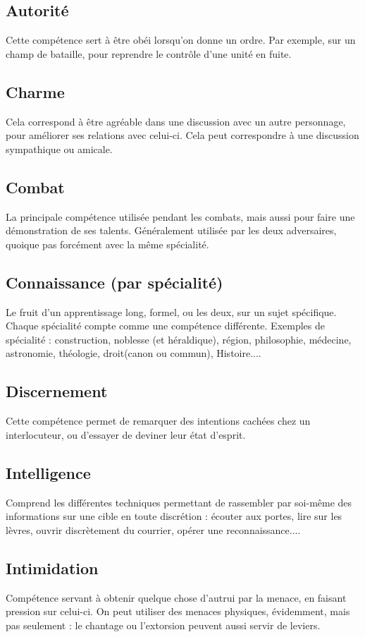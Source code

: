 \documentclass[10pt,a4paper]{book}
\begin{document}
\begin{multicols}{2}
\subsection*{Autorité} Cette compétence sert à être obéi lorsqu'on donne un ordre. Par exemple, sur un champ de bataille, pour reprendre le contrôle d'une unité en fuite.
\subsection*{Charme}Cela correspond à être agréable dans une discussion avec un autre personnage, pour améliorer ses relations avec celui-ci. Cela peut correspondre à une discussion sympathique ou amicale.
\subsection*{Combat} La principale compétence utilisée pendant les combats, mais aussi pour faire une démonstration de ses talents. Généralement utilisée par les deux adversaires, quoique pas forcément avec la même spécialité.
\subsection*{Connaissance (par spécialité)} Le fruit d'un apprentissage long, formel, ou les deux, sur un sujet spécifique. Chaque spécialité compte comme une compétence différente. Exemples de spécialité : construction, noblesse (et héraldique), région, philosophie, médecine, astronomie, théologie, droit(canon ou commun), Histoire....
\subsection*{Discernement}Cette compétence permet de remarquer des intentions cachées chez un interlocuteur, ou d'essayer de deviner leur état d'esprit. 
\subsection*{Intelligence}Comprend les différentes techniques permettant de rassembler par soi-même des informations sur une cible en toute discrétion : écouter aux portes, lire sur les lèvres, ouvrir discrètement du courrier, opérer une reconnaissance....
\subsection*{Intimidation}Compétence servant à obtenir quelque chose d'autrui par la menace, en faisant pression sur celui-ci. On peut utiliser des menaces physiques, évidemment, mais pas seulement : le chantage ou l'extorsion peuvent aussi servir de leviers.

\end{multicols}
\end{document}
